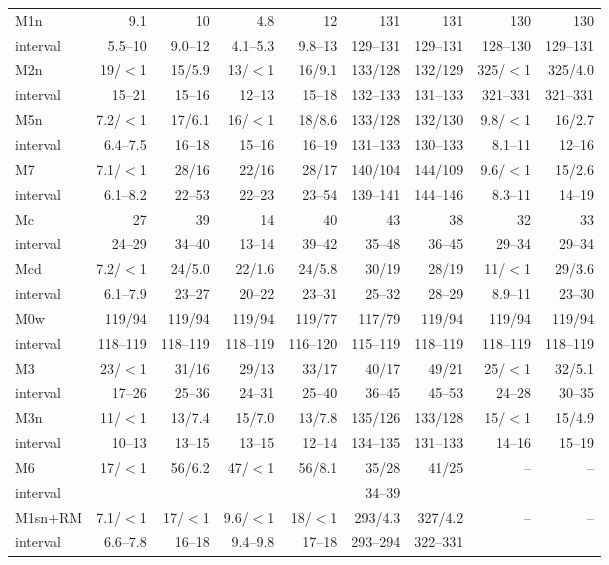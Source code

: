 \documentclass[pdflatex,sn-basic]{sn-jnl}
\begin{document}
\begin{table}[p]
\begin{tabular}{@{}lrrrrrrrr@{}}
M1n & 9.1 & 10 & 4.8 & 12 & 131 & 131 & 130 & 130 \\
\quad interval & 5.5--10 & 9.0--12 & 4.1--5.3 & 9.8--13 & 129--131 & 129--131 & 128--130 & 129--131 \\
M2n & 19/$<$1 & 15/5.9 & 13/$<$1 & 16/9.1 & 133/128 & 132/129 & 325/$<$1 & 325/4.0 \\
\quad interval & 15--21 & 15--16 & 12--13 & 15--18 & 132--133 & 131--133 & 321--331 & 321--331 \\
M5n & 7.2/$<$1 & 17/6.1 & 16/$<$1 & 18/8.6 & 133/128 & 132/130 & 9.8/$<$1 & 16/2.7 \\
\quad interval & 6.4--7.5 & 16--18 & 15--16 & 16--19 & 131--133 & 130--133 & 8.1--11 & 12--16 \\
M7 & 7.1/$<$1 & 28/16 & 22/16 & 28/17 & 140/104 & 144/109 & 9.6/$<$1 & 15/2.6 \\
\quad interval & 6.1--8.2 & 22--53 & 22--23 & 23--54 & 139--141 & 144--146 & 8.3--11 & 14--19 \\
Mc & 27 & 39 & 14 & 40 & 43 & 38 & 32 & 33 \\
\quad interval & 24--29 & 34--40 & 13--14 & 39--42 & 35--48 & 36--45 & 29--34 & 29--34 \\
Mcd & 7.2/$<$1 & 24/5.0 & 22/1.6 & 24/5.8 & 30/19 & 28/19 & 11/$<$1 & 29/3.6 \\
\quad interval & 6.1--7.9 & 23--27 & 20--22 & 23--31 & 25--32 & 28--29 & 8.9--11 & 23--30 \\
M0w & 119/94 & 119/94 & 119/94 & 119/77 & 117/79 & 119/94 & 119/94 & 119/94 \\
\quad interval & 118--119 & 118--119 & 118--119 & 116--120 & 115--119 & 118--119 & 118--119 & 118--119 \\
M3 & 23/$<$1 & 31/16 & 29/13 & 33/17 & 40/17 & 49/21 & 25/$<$1 & 32/5.1 \\
\quad interval & 17--26 & 25--36 & 24--31 & 25--40 & 36--45 & 45--53 & 24--28 & 30--35 \\
M3n & 11/$<$1 & 13/7.4 & 15/7.0 & 13/7.8 & 135/126 & 133/128 & 15/$<$1 & 15/4.9 \\
\quad interval & 10--13 & 13--15 & 13--15 & 12--14 & 134--135 & 131--133 & 14--16 & 15--19 \\
M6 & 17/$<$1 & 56/6.2 & 47/$<$1 & 56/8.1 & 35/28 & 41/25 & -- & -- \\
\quad interval &  &  &  &  & 34--39 &  &  & \\
M1sn+RM & 7.1/$<$1 & 17/$<$1 & 9.6/$<$1 & 18/$<$1 & 293/4.3 & 327/4.2 & -- & -- \\
\quad interval & 6.6--7.8 & 16--18 & 9.4--9.8 & 17--18 & 293--294 & 322--331 &  & \\

\end{tabular}
\end{table}
\end{document}
